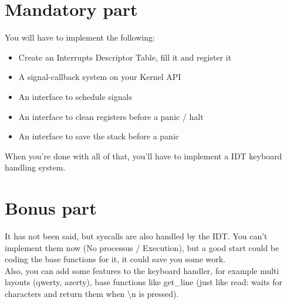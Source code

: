 \documentclass{42-en}
\begin{document}
\newpage
\chapter{Mandatory part}
	You will have to implement the following:
	\begin{itemize}\itemsep1pt
		\item Create an Interrupts Descriptor Table, fill it and register it
		\item A signal-callback system on your Kernel API
		\item An interface to schedule signals
		\item An interface to clean registers before a panic / halt
		\item An interface to save the stack before a panic
	\end{itemize}
	When you're done with all of that, you'll have to implement a IDT
    keyboard handling system.


\newpage
\chapter{Bonus part}

	It has not been said, but syscalls are also handled by the IDT.
    You can't implement them now (No processus / Execution), but a
    good start could be coding the base functions for it, it could
    save you some work.\\
	Also, you can add some features to the keyboard handler, for
    example multi layouts (qwerty, azerty), base functions like
    get\_line (just like read: waits for characters and return them
    when \textbackslash n is pressed).

\newpage
\end{document}
